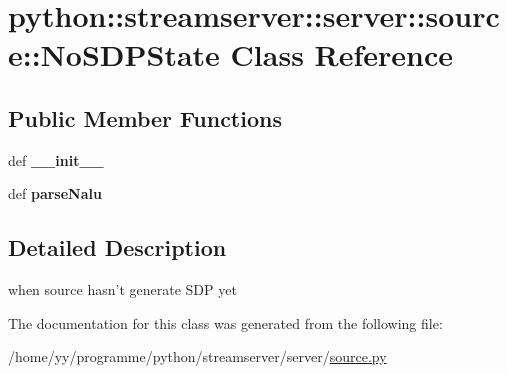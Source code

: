 \hypertarget{classpython_1_1streamserver_1_1server_1_1source_1_1NoSDPState}{
\section{python::streamserver::server::source::NoSDPState Class Reference}
\label{classpython_1_1streamserver_1_1server_1_1source_1_1NoSDPState}
}
\subsection*{Public Member Functions}
\begin{DoxyCompactItemize}
\item 
\hypertarget{classpython_1_1streamserver_1_1server_1_1source_1_1NoSDPState_aa7b1020ce67ee1bca1616672cf9261d3}{
def {\bfseries \_\-\_\-init\_\-\_\-}}
\label{classpython_1_1streamserver_1_1server_1_1source_1_1NoSDPState_aa7b1020ce67ee1bca1616672cf9261d3}

\item 
\hypertarget{classpython_1_1streamserver_1_1server_1_1source_1_1NoSDPState_a312ccd7f23c70a069bdcf0232ff37d2a}{
def {\bfseries parseNalu}}
\label{classpython_1_1streamserver_1_1server_1_1source_1_1NoSDPState_a312ccd7f23c70a069bdcf0232ff37d2a}

\end{DoxyCompactItemize}


\subsection{Detailed Description}
\begin{DoxyVerb}when source hasn't generate SDP yet\end{DoxyVerb}
 

The documentation for this class was generated from the following file:\begin{DoxyCompactItemize}
\item 
/home/yy/programme/python/streamserver/server/\hyperlink{source_8py}{source.py}\end{DoxyCompactItemize}
